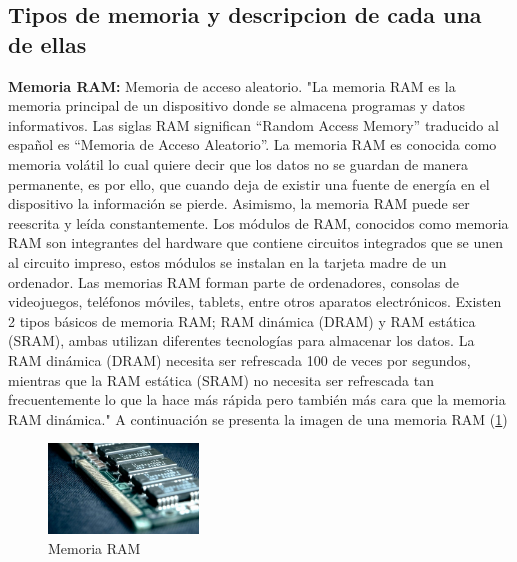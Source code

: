 \documentclass{article}
\begin{document}
\subsection{Tipos de memoria y descripcion de cada una de ellas}
\textbf{Memoria RAM:}
Memoria de acceso aleatorio.
\newline
\newline
"La memoria RAM es la memoria principal de un dispositivo donde se almacena programas y datos informativos. Las siglas RAM significan “Random Access Memory” traducido al español es “Memoria de Acceso Aleatorio”.
La memoria RAM es conocida como memoria volátil lo cual quiere decir que los datos no se guardan de manera permanente, es por ello, que cuando deja de existir una fuente de energía en el dispositivo la información se pierde. Asimismo, la memoria RAM puede ser reescrita y leída constantemente.
Los módulos de RAM, conocidos como memoria RAM son integrantes del hardware que contiene circuitos integrados que se unen al circuito impreso, estos módulos se instalan en la tarjeta madre de un ordenador. Las memorias RAM forman parte de ordenadores, consolas de videojuegos, teléfonos móviles, tablets, entre otros aparatos electrónicos.
Existen 2 tipos básicos de memoria RAM; RAM dinámica (DRAM) y RAM estática (SRAM), ambas utilizan diferentes tecnologías para almacenar los datos. La RAM dinámica (DRAM) necesita ser refrescada 100 de veces por segundos, mientras que la RAM estática (SRAM) no necesita ser refrescada tan frecuentemente lo que la hace más rápida pero también más cara que la memoria RAM dinámica."\cite{RAM} 
\newline
\newline
A continuación se presenta la imagen de una memoria RAM (\ref{fig:memoria-RAM})
\begin{figure}[h]
\includegraphics[width=4cm]{memoria-RAM.jpg}\centering
\caption{Memoria RAM}
\label{fig:memoria-RAM}
\end{figure}
\end{document}
